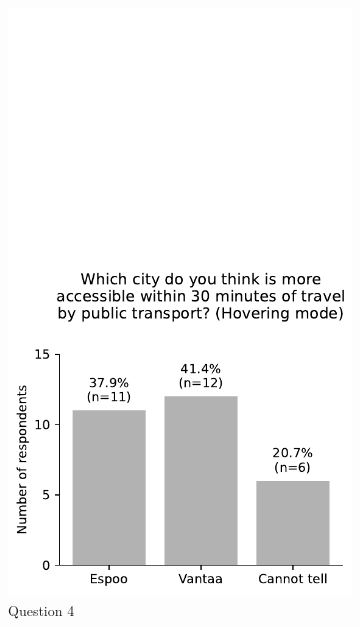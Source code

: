 \begin{figure}[H]
	\centering
	\begin{subfigure}[b]{0.5\textwidth}
		\centering
		\includegraphics[width=\textwidth]{images/questionnaire/3.pdf}
		\caption{Question 4}
		\label{fig:Question 4}
	\end{subfigure}%
	\hfill
	\begin{subfigure}[b]{0.5\textwidth}
		\centering

\end{subfigure}
\end{figure}
